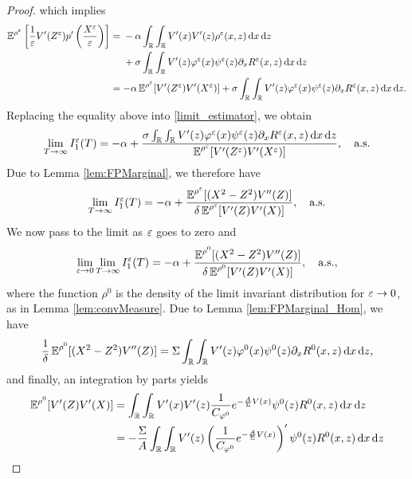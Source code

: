 \documentclass[10pt]{article}
\begin{document}
\begin{proof}
which implies
\begin{align}
	\operatorname{\mathbb{E}}^{\rho^\varepsilon} \left [ \frac{1}{\varepsilon} V'(Z^\varepsilon) p' \left ( \frac{X^\varepsilon}{\varepsilon} \right ) \right ] &= 
	\begin{aligned}[t]
		&-\alpha \int_{\mathbb{R}} \int_{\mathbb{R}} V'(x) V'(z) \rho^\varepsilon(x, z) \,\mathrm{d} x \,\mathrm{d} z \\
		&+\sigma \int_{\mathbb{R}} \int_{\mathbb{R}} V'(z) \varphi^\varepsilon(x) \psi^\varepsilon(z) \partial_x R^\varepsilon(x,z) \,\mathrm{d} x \,\mathrm{d} z 
	\end{aligned}
	\\
	&= - \alpha \operatorname{\mathbb{E}}^{\rho^\varepsilon} [ V'(Z^\varepsilon) V'(X^\varepsilon) ] + \sigma \int_{\mathbb{R}} \int_{\mathbb{R}} V'(z) \varphi^\varepsilon(x) \psi^\varepsilon(z) \partial_x R^\varepsilon(x,z) \,\mathrm{d} x \,\mathrm{d} z.
\end{align}
Replacing the equality above into \eqref{limit_estimator}, we obtain
\begin{equation}
\lim_{T \to \infty} I_1^\varepsilon(T) = -\alpha + \frac{\sigma \int_{\mathbb{R}} \int_{\mathbb{R}} V'(z) \varphi^\varepsilon(x) \psi^\varepsilon(z) \partial_x R^\varepsilon(x,z) \,\mathrm{d} x \,\mathrm{d} z}{\operatorname{\mathbb{E}}^{\rho^\varepsilon} [ V'(Z^\varepsilon) V'(X^\varepsilon) ]}, \quad \text{a.s.}
\end{equation}
Due to Lemma \ref{lem:FPMarginal}, we therefore have
\begin{equation}
	\lim_{T \to \infty} I_1^\varepsilon(T) = -\alpha + \frac{\operatorname{\mathbb{E}}^{\rho^\varepsilon}[(X^2 - Z^2)V''(Z)]}{\delta \operatorname{\mathbb{E}}^{\rho^\varepsilon}[V'(Z) V'(X)]}, \quad \text{a.s.}	
\end{equation}
We now pass to the limit as $\varepsilon$ goes to zero and
\begin{equation} \label{limit_estimator_2}
	\lim_{\varepsilon \to 0} \lim_{T \to \infty} I_1^\varepsilon(T) = -\alpha + \frac{\operatorname{\mathbb{E}}^{\rho^0}[(X^2 - Z^2)V''(Z)]}{\delta \operatorname{\mathbb{E}}^{\rho^0}[V'(Z) V'(X)]}, \quad \text{a.s.},
\end{equation}
where the function $\rho^0$ is the density of the limit invariant distribution for $\varepsilon \to 0$, as in Lemma \ref{lem:convMeasure}. Due to Lemma \ref{lem:FPMarginal_Hom}, we have
\begin{equation}\label{eq:final_result}
\frac{1}{\delta} \operatorname{\mathbb{E}}^{\rho^0}[(X^2 - Z^2)V''(Z)] = \Sigma \int_{\mathbb{R}} \int_{\mathbb{R}} V'(z) \varphi^0(x) \psi^0(z) \partial_x R^0(x,z) \,\mathrm{d} x \,\mathrm{d} z,
\end{equation}
and finally, an integration by parts yields
\begin{align}
	\E^{\rho^0}[V'(Z) V'(X)] &= \int_{\R} \int_{\R} V'(x) V'(z) \frac{1}{C_{\phi^0}} e^{-\frac{A}{\Sigma} V(x)} \psi^0(z) R^0(x,z) \dd x \dd z \\
	&= - \frac{\Sigma}{A} \int_{\R} \int_{\R} V'(z) \left ( \frac{1}{C_{\phi^0}} e^{-\frac{A}{\Sigma} V(x)} \right )' \psi^0(z) R^0(x,z) \dd x \dd z \\

\end{align}
\end{proof}
\end{document}
